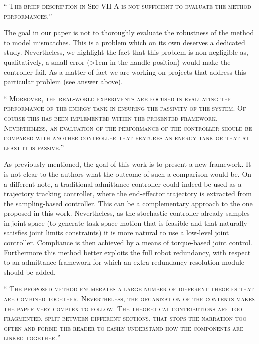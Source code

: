 \documentclass[10pt]{article}
\newcommand{\referee}[1]{\;
  \begin{minipage}[t]{.95\textwidth}
    ``{\small\color{red} \textsc{#1}}''
  \end{minipage}\medskip
  }
\begin{document}
\begin{enumerate}[label={[R7:\,\arabic{enumi}]}]
\item\label{reply:R7:6} 
\referee{The brief description in Sec VII-A is not sufficient to evaluate the method performances.}

The goal in our paper is not to thoroughly evaluate the robustness of the method to model mismatches. This is a problem which on its own deserves a dedicated study. Nevertheless, we highlight the fact that this problem is non-negligible as, qualitatively, a small error (>1cm in the handle position) would make the controller fail. As a matter of fact we are working on projects that address this particular problem (see answer above).


\item\label{reply:R7:7} 
\referee{Moreover, the real-world experiments are focused in evaluating the performance of the energy tank in ensuring the passivity of the system. Of course this has been implemented within the presented framework. Nevertheless, an evaluation of the performance of the controller should
be compared with another controller that features an energy tank or that at least it is passive.}

As previously mentioned, the goal of this work is to present a new framework. It is not clear to the authors what the outcome of such a comparison would be. On a different note, a traditional admittance controller could indeed be used as a trajectory tracking controller, where the end-effector trajectory is extracted from the sampling-based controller. This can be a complementary approach to the one proposed in this work. Nevertheless, as the stochastic controller already samples in joint space (to generate task-space motion that is feasible and that naturally satisfies joint limits constraints) it is more natural to use a low-level joint controller. Compliance is then achieved by a means of torque-based joint control. Furthermore this method better exploits the full robot redundancy, with respect to an admittance framework for which an extra redundancy resolution module should be added.

\item\label{reply:R7:8} 
\referee{The proposed method enumerates a large number of different theories that are combined together. Nevertheless, the organization of the contents makes the paper very complex to follow. The theoretical contributions are too fragmented, split between different sections, that stops the narration too often and forbid the reader to easily understand how the components are linked together.}


\end{enumerate}
\end{document}
